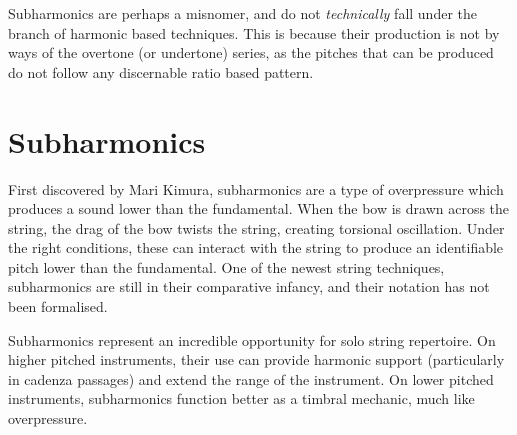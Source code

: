 Subharmonics are perhaps a misnomer, and do not \emph{technically} fall under the branch of harmonic based techniques.
This is because their production is not by ways of the overtone (or undertone) series, as the pitches that can be produced do not follow any discernable ratio based pattern.





\newpage
\section{Subharmonics} \label{sec:subharmonicsDiscussion}
First discovered by Mari Kimura, subharmonics are a type of overpressure which produces a sound lower than the fundamental.\autocite{kimuraHowProduceSubharmonics1999} 
When the bow is drawn across the string, the drag of the bow twists the string, creating torsional oscillation. 
Under the right conditions, these can interact with the string to produce an identifiable pitch lower than the fundamental.\autocite{Subharmonics2006} 
One of the newest string techniques, subharmonics are still in their comparative infancy, and their notation has not been formalised. 

Subharmonics represent an incredible opportunity for solo string repertoire. 
On higher pitched instruments, their use can provide harmonic support (particularly in cadenza passages) and extend the range of the instrument. 
On lower pitched instruments, subharmonics function better as a timbral mechanic, much like overpressure. 

